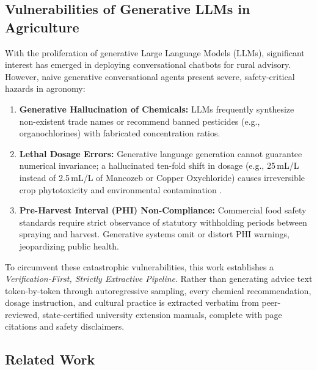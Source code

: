 \documentclass[conference]{IEEEtran}
\begin{document}
\subsection{Vulnerabilities of Generative LLMs in Agriculture}
With the proliferation of generative Large Language Models (LLMs), significant interest has emerged in deploying conversational chatbots for rural advisory. However, naive generative conversational agents present severe, safety-critical hazards in agronomy:
\begin{enumerate}
    \item \textbf{Generative Hallucination of Chemicals:} LLMs frequently synthesize non-existent trade names or recommend banned pesticides (e.g., organochlorines) with fabricated concentration ratios.
    \item \textbf{Lethal Dosage Errors:} Generative language generation cannot guarantee numerical invariance; a hallucinated ten-fold shift in dosage (e.g., 25\,mL/L instead of 2.5\,mL/L of Mancozeb or Copper Oxychloride) causes irreversible crop phytotoxicity and environmental contamination \cite{icar2021guidelines}.
    \item \textbf{Pre-Harvest Interval (PHI) Non-Compliance:} Commercial food safety standards require strict observance of statutory withholding periods between spraying and harvest. Generative systems omit or distort PHI warnings, jeopardizing public health.
\end{enumerate}

To circumvent these catastrophic vulnerabilities, this work establishes a \textit{Verification-First, Strictly Extractive Pipeline}. Rather than generating advice text token-by-token through autoregressive sampling, every chemical recommendation, dosage instruction, and cultural practice is extracted verbatim from peer-reviewed, state-certified university extension manuals, complete with page citations and safety disclaimers.

\subsection{Related Work}
\end{document}
